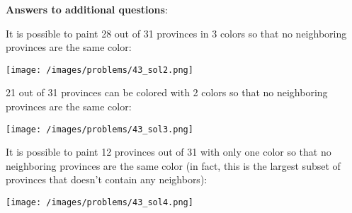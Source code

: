 \begin{solution}
\textbf{Answers to additional questions}:

It is possible to paint 28 out of 31 provinces in 3 colors so that no neighboring provinces are the same color:

\begin{center}
	\texttt{[image: /images/problems/43\_sol2.png]}
\end{center}

21 out of 31 provinces can be colored with 2 colors so that no neighboring provinces are the same color:

\begin{center}
	\texttt{[image: /images/problems/43\_sol3.png]}
\end{center}

It is possible to paint 12 provinces out of 31 with only one color so that no neighboring provinces are the same color (in fact, this is the largest subset of provinces that doesn't contain any neighbors):

\begin{center}
	\texttt{[image: /images/problems/43\_sol4.png]}
\end{center}


\end{solution}